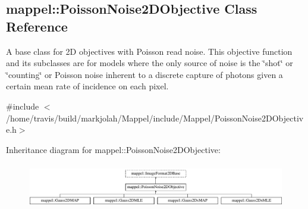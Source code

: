 \hypertarget{classmappel_1_1PoissonNoise2DObjective}{}\subsection{mappel\+:\+:Poisson\+Noise2\+D\+Objective Class Reference}
\label{classmappel_1_1PoissonNoise2DObjective}


A base class for 2D objectives with Poisson read noise. This objective function and its subclasses are for models where the only source of noise is the \char`\"{}shot\char`\"{} or \char`\"{}counting\char`\"{} or Poisson noise inherent to a discrete capture of photons given a certain mean rate of incidence on each pixel.  




{\ttfamily \#include $<$/home/travis/build/markjolah/\+Mappel/include/\+Mappel/\+Poisson\+Noise2\+D\+Objective.\+h$>$}

Inheritance diagram for mappel\+:\+:Poisson\+Noise2\+D\+Objective\+:\begin{figure}[H]
\begin{center}
\leavevmode
\includegraphics[height=1.981132cm]{classmappel_1_1PoissonNoise2DObjective}
\end{center}
\end{figure}
